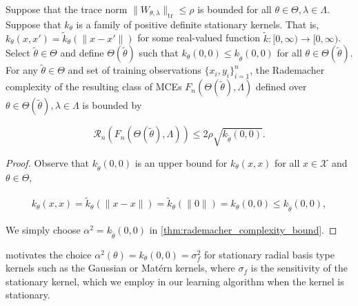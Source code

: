 \documentclass{llncs}
\numberwithin{equation}{section}
\numberwithin{table}{section}
\numberwithin{algorithm}{section}
\begin{document}
	\begin{corollary}
		\label{thm:rademacher_complexity_stationary_kernels_bound}
		
		Suppose that the trace norm $\| W_{\theta, \lambda} \|_{\mathrm{tr}} \leq \rho$ is bounded for all $\theta \in \Theta, \lambda \in \Lambda$. Suppose that $k_{\theta}$ is a family of positive definite stationary kernels. That is, $k_{\theta} (x, x') = \tilde{k}_{\theta}( \| x - x' \| )$ for some real-valued function $\tilde{k} : [0, \infty) \to [0, \infty)$. Select $\tilde{\theta} \in \Theta$ and define $\Theta(\tilde{\theta})$ such that $k_{\theta}(0, 0) \leq k_{\tilde{\theta}}(0, 0)$ for all $\theta \in \Theta(\tilde{\theta})$. For any $\tilde{\theta} \in \Theta$ and set of training observations $\{x_{i}, y_{i}\}_{i = 1}^{n}$, the Rademacher complexity of the resulting class of \glspl{MCE} $F_{n}(\Theta(\tilde{\theta}), \Lambda)$ defined over $\theta \in \Theta(\tilde{\theta}), \lambda \in \Lambda$ is bounded by
		
		\begin{equation}
		\mathcal{R}_{n}(F_{n}(\Theta(\tilde{\theta}), \Lambda)) \leq 2 \rho \sqrt{k_{\tilde{\theta}}(0, 0)}.
		\end{equation}
		
		\begin{proof}
			
			Observe that $k_{\tilde{\theta}}(0, 0)$ is an upper bound for $k_{\theta}(x, x)$ for all $x \in \mathcal{X}$ and $\theta \in \Theta$,
			
			\begin{equation}
			\begin{aligned}
			k_{\theta}(x, x) = \tilde{k}_{\theta}( \| x - x \| ) = \tilde{k}_{\theta}( \| 0 \| ) = k_{\theta}(0, 0) \leq k_{\tilde{\theta}}(0, 0),
			\end{aligned}
			\end{equation}
			
			We simply choose $\alpha^{2} = k_{\tilde{\theta}}(0, 0)$ in \cref{thm:rademacher_complexity_bound}.
		\end{proof}
		
	\end{corollary}
	
	 motivates the choice $\alpha^{2}(\theta) = k_{\theta}(0, 0) = \sigma_{f}^{2}$ for stationary radial basis type kernels such as the Gaussian or Mat\'{e}rn kernels, where $\sigma_{f}$ is the sensitivity \citep{rasmussen2006gaussian} of the stationary kernel, which we employ in our learning algorithm when the kernel is stationary.
	
\end{document}
